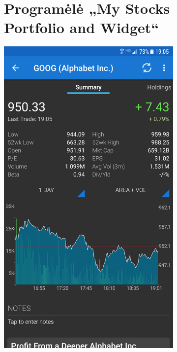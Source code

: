\documentclass[a4paper,12pt,fleqn]{article}
\begin{document}
\begin{appendices}
\begin{figure}[h]
\begin{subfigure}{0.5\textwidth}
		\label{app:priedas1}
	\end{subfigure}%
	\begin{subfigure}{0.5\textwidth}
		\centering
		\tocless\section{Programėlė „My Stocks Portfolio and Widget“}
		\includegraphics[scale=0.4]{priedas2.png}
		\label{app:priedas2}
	\end{subfigure}

\end{figure}
\end{appendices}
\end{document}
